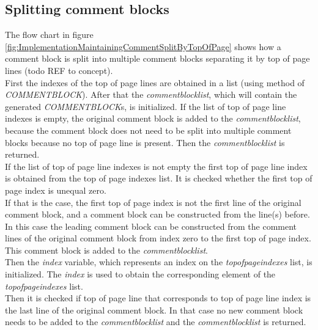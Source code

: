 \subsection{Splitting comment blocks}\label{sec:ImplementationMaintainingCommentsSplitByTop}
The flow chart in figure \ref{fig:ImplementationMaintainingCommentSplitByTopOfPage} shows how a comment block is split into multiple comment blocks separating it by top of page lines (todo REF to concept).\\
First the indexes of the top of page lines are obtained in a list (using method of \textit{COMMENT\textunderscore BLOCK}).
After that the \textit{comment\textunderscore block\textunderscore list}, which will contain the generated \textit{COMMENT\textunderscore BLOCK}s, is initialized.
If the list of top of page line indexes is empty, the original comment block is added to the \textit{comment\textunderscore block\textunderscore list}, because the comment block does not need to be split into multiple comment blocks because no top of page line is present.
Then the \textit{comment\textunderscore block\textunderscore list} is returned.\\
If the list of top of page line indexes is not empty the first top of page line index is obtained from the top of page indexes list.
It is checked whether the first top of page index is unequal zero.\\
If that is the case, the first top of page index is not the first line of the original comment block, and a comment block can be constructed from the line(s) before.
In this case the leading comment block can be constructed from the comment lines of the original comment block from index zero to the first top of page index.
This comment block is added to the \textit{comment\textunderscore block\textunderscore list}.\\
Then the \textit{index} variable, which represents an index on the \textit{top\textunderscore of\textunderscore page\textunderscore indexes} list, is initialized.
The \textit{index} is used to obtain the corresponding element of the \textit{top\textunderscore of\textunderscore page\textunderscore indexes} list.\\
Then it is checked if top of page line that corresponds to top of page line index is the last line of the original comment block.
In that case no new comment block needs to be added to the \textit{comment\textunderscore block\textunderscore list} and the \textit{comment\textunderscore block\textunderscore list} is returned.\\
